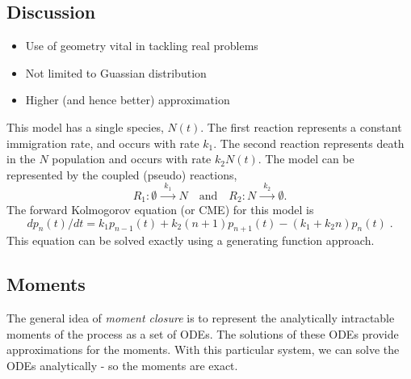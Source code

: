 \documentclass{pnastwo}
\begin{document}
\begin{article}
\section{Discussion}

\begin{itemize}
\item Use of geometry vital in tackling real problems
\item Not limited to Guassian distribution
\item Higher (and hence better) approximation
\end{itemize}








This model has a single species, $N(t)$. The first reaction represents a constant immigration rate, and occurs with rate $k_1$. The second reaction represents death in the $N$ population and occurs with rate $k_2 N(t)$. The model can be represented by the coupled (pseudo) reactions, 
\begin{equation}\label{1}
R_1: \emptyset  \xrightarrow{\phantom{a}k_1\phantom{a}} N 
\quad \text{and} \quad
R_2: N  \xrightarrow{\phantom{a}k_2\phantom{a}} \emptyset.
\end{equation}
The forward Kolmogorov equation (or CME) for this model is
\[
dp_{n}(t)/dt = k_1 p_{n-1}(t) +  k_2 (n+1) p_{n+1}(t) 
- (k_1 + k_2 n) p_{n}(t) \;.
\]
This equation can be solved exactly using a generating function approach.

\subsection{Moments}

The general idea of \textit{moment closure} is to represent the analytically intractable moments of the process as a set of ODEs. The solutions of these ODEs provide approximations for the moments. With this particular system, we can solve the ODEs analytically - so the moments are exact.


\end{article}
\end{document}
